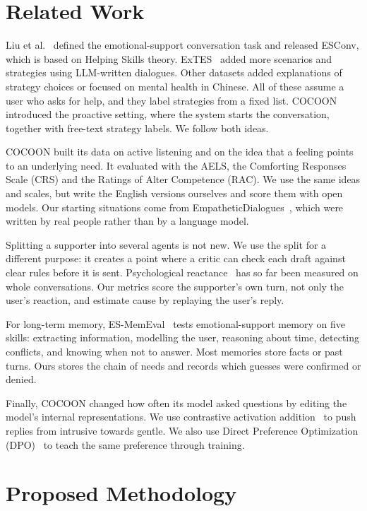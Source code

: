\documentclass[journal]{IEEEtran}
\begin{document}
\section{Related Work}
Liu et al.~\cite{liu2021} defined the emotional-support conversation task and released ESConv, which is based on Helping Skills theory. ExTES~\cite{zheng2024} added more scenarios and strategies using LLM-written dialogues. Other datasets added explanations of strategy choices or focused on mental health in Chinese. All of these assume a user who asks for help, and they label strategies from a fixed list. COCOON~\cite{fu2025} introduced the proactive setting, where the system starts the conversation, together with free-text strategy labels. We follow both ideas.

COCOON built its data on active listening and on the idea that a feeling points to an underlying need. It evaluated with the AELS, the Comforting Responses Scale (CRS) and the Ratings of Alter Competence (RAC). We use the same ideas and scales, but write the English versions ourselves and score them with open models. Our starting situations come from EmpatheticDialogues~\cite{rashkin2019}, which were written by real people rather than by a language model.

Splitting a supporter into several agents is not new. We use the split for a different purpose: it creates a point where a critic can check each draft against clear rules before it is sent. Psychological reactance~\cite{dillard2005} has so far been measured on whole conversations. Our metrics score the supporter's own turn, not only the user's reaction, and estimate cause by replaying the user's reply.

For long-term memory, ES-MemEval~\cite{chen2026} tests emotional-support memory on five skills: extracting information, modelling the user, reasoning about time, detecting conflicts, and knowing when not to answer. Most memories store facts or past turns. Ours stores the chain of needs and records which guesses were confirmed or denied.

Finally, COCOON changed how often its model asked questions by editing the model's internal representations. We use contrastive activation addition~\cite{rimsky2024} to push replies from intrusive towards gentle. We also use Direct Preference Optimization (DPO)~\cite{rafailov2023} to teach the same preference through training.

\section{Proposed Methodology}
\end{document}
